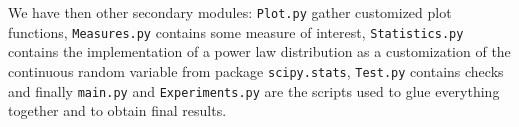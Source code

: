 \documentclass[a4paper, 11pt]{article}
\begin{document}
We have then other secondary modules: \texttt{Plot.py} gather customized plot functions, \texttt{Measures.py} contains some measure of interest, \texttt{Statistics.py} contains the implementation of a power law distribution as a customization of the continuous random variable from package \texttt{scipy.stats}, \texttt{Test.py} contains checks and finally \texttt{main.py} and \texttt{Experiments.py} are the scripts used to glue everything together and to obtain final results.




\end{document}
